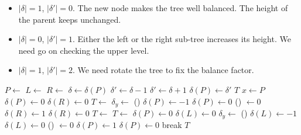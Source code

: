 \documentclass[b5paper]{article}
\begin{document}
\begin{itemize}
\item $|\delta| = 1$, $|\delta'| = 0$. The new node makes the tree well balanced. The height of the parent keeps unchanged.

\item $|\delta| = 0$, $|\delta'| = 1$. Either the left or the right sub-tree increases its height. We need go on checking the upper level.

\item $|\delta| = 1$, $|\delta'| = 2$. We need rotate the tree to fix the balance factor.
\end{itemize}

\begin{algorithmic}[1]
    \State $P \gets $ 
    \State $L \gets $ 
    \State $R \gets $ 
    \State $\delta \gets \delta(P)$
      \State $\delta' \gets \delta - 1$
    \Else
      \State $\delta' \gets \delta + 1$
    \EndIf
    \State $\delta(P) \gets \delta'$
     
      \State \Return $T$
     
      \State $x \gets P$
         
          \State $\delta(P) \gets 0$ 
          \State $\delta(R) \gets 0$
          \State $T \gets $ 
        \EndIf
         
          \State $\delta_y \gets $ \textproc{$\delta$}() 
            \State $\delta(P) \gets -1$
          \Else
            \State $\delta(P) \gets 0$
          \EndIf
          \State \textproc{$\delta$}() $\gets 0$
            \State $\delta(R) \gets 1$
          \Else
            \State $\delta(R) \gets 0$
          \EndIf
          \State $T \gets $ 
          \State $T \gets $ 
        \EndIf
      \EndIf
         
          \State $\delta(P) \gets 0$
          \State $\delta(L) \gets 0$
          \State {}
        \Else {}
          \State $\delta_y \gets $ \textproc{$\delta$}()
            \State $\delta(L) \gets -1$
          \Else
            \State $\delta(L) \gets 0$
          \EndIf
          \State \textproc{$\delta$}() $\gets 0$
            \State $\delta(P) \gets 1$
          \Else
            \State $\delta(P) \gets 0$
          \EndIf
          \State {}
          \State {}
        \EndIf
      \EndIf
      \State break
    \EndIf
  \EndWhile
  \State \Return $T$
\EndFunction
\end{algorithmic}
\end{document}
